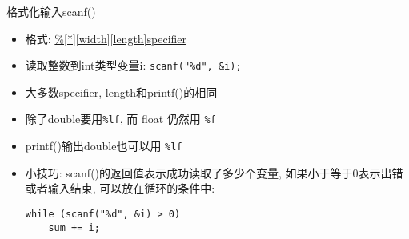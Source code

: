 \begin{frame}[fragile]{格式化输入scanf()}
\begin{itemize}[<+- | alert@+>]
\item 格式: \href{http://www.cplusplus.com/reference/cstdio/scanf/}{\%[*][width][length]specifier}
\item 读取整数到int类型变量i: \texttt{scanf("\%d", \alert{\&}i);}
\item 大多数specifier, length和printf()的相同
\item 除了double要用\texttt{\%lf}, 而 float 仍然用 \texttt{\%f}
\item printf()输出double也可以用 \texttt{\%lf}
\item 小技巧: scanf()的返回值表示成功读取了多少个变量, 如果小于等于0表示出错或者输入结束, 可以放在循环的条件中:
\begin{verbatim}
while (scanf("%d", &i) > 0)
    sum += i;
\end{verbatim}
\end{itemize}
\end{frame}